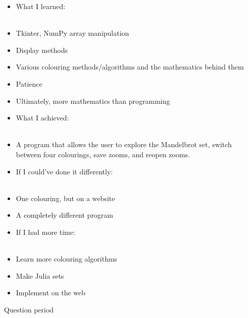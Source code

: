 \documentclass{beamer}
\begin{document}
\frame
{
\begin{itemize}
\item <1-> What I learned:\\\text{}\\
\item <2-> Tkinter, NumPy array manipulation\\
\item <3-> Display methods\\
\item <4-> Various colouring methods/algorithms and the mathematics behind them\\
\item <5-> Patience\\
\item <6-> Ultimately, more mathematics than programming
\end{itemize}
}

\frame
{
\begin{itemize}
\item <1-> What I achieved:\\\text{}\\
\item <2-> A program that allows the user to explore the Mandelbrot set, switch between four colourings, save zooms, and reopen zooms.
\end{itemize}
}

\frame
{
\begin{itemize}
\item <1-> If I could've done it differently:\\\text{}\\
\item <2-> One colouring, but on a website\\
\item <3-> A completely different program
\end{itemize}
}

\frame
{
\begin{itemize}
\item <1-> If I had more time:\\\text{}\\
\item <2-> Learn more colouring algorithms\\
\item <3-> Make Julia sets\\
\item <4-> Implement on the web
\end{itemize}
}

\frame
{
Question period
}
\end{document}
